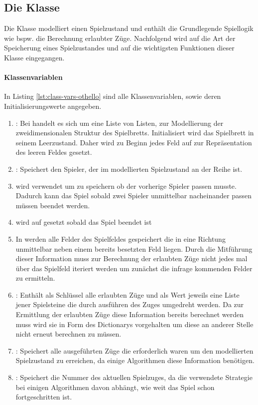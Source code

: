 \subsection{Die Klasse }
\label{ot1}
Die Klasse  modelliert einen Spielzustand und enthält die Grundlegende Spiellogik wie bspw. die Berechnung erlaubter Züge. Nachfolgend wird auf die Art der Speicherung eines Spielzustandes und auf die wichtigsten Funktionen dieser Klasse eingegangen.
\paragraph{Klassenvariablen}
In Listing \ref{lst:class-vars-othello} sind alle Klassenvariablen, sowie deren Initialisierungswerte angegeben.
\begin{enumerate}
\item {}: Bei  handelt es sich um eine Liste von Listen, zur Modellierung der zweidimensionalen Struktur des Spielbretts. Initialisiert wird das Spielbrett in seinem Leerzustand. Daher wird zu Beginn jedes Feld auf  zur Repräsentation des leeren Feldes gesetzt.
\item {}: Speichert den Spieler, der im modellierten Spielzustand an der Reihe ist.
\item {} wird verwendet um zu speichern ob der vorherige Spieler  passen musste. Dadurch kann das Spiel sobald zwei Spieler unmittelbar nacheinander passen müssen beendet werden.
\item {} wird auf  gesetzt sobald das Spiel beendet ist
\item {} In  werden alle Felder des Spielfeldes gespeichert die in eine Richtung unmittelbar neben einem bereits besetzten Feld liegen. Durch die Mitführung dieser Information muss zur Berechnung der erlaubten Züge nicht jedes mal über das Spielfeld iteriert werden um zunächst die infrage kommenden Felder zu ermitteln.
\item {}: Enthält als Schlüssel alle erlaubten Züge und als Wert jeweils eine Liste jener Spielsteine die durch ausführen des Zuges umgedreht werden. Da zur Ermittlung der erlaubten Züge diese Information bereits berechnet werden muss wird sie in Form des Dictionarys vorgehalten um diese an anderer Stelle nicht erneut berechnen zu müssen.
\item {}: Speichert alle ausgeführten Züge die erforderlich waren um den modellierten Spielzustand zu erreichen, da einige Algorithmen diese Information benötigen.
\item {}: Speichert die Nummer des aktuellen Spielzuges, da die verwendete Strategie bei einigen Algorithmen davon abhängt, wie weit das Spiel schon fortgeschritten ist.
\end{enumerate}
